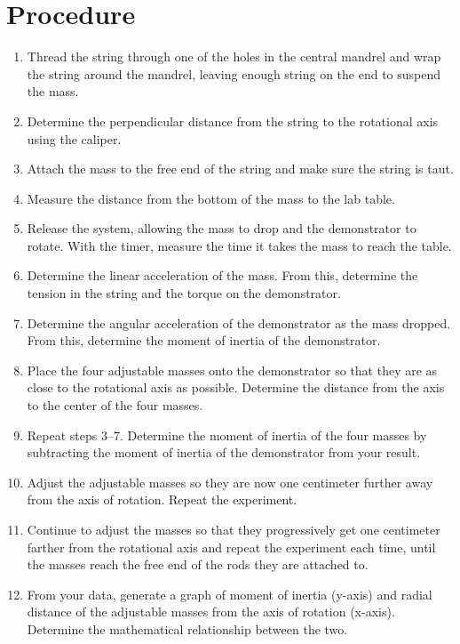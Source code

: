 \documentclass[11pt]{article}
\begin{document}
\section*{Procedure}
\begin{enumerate}[noitemsep]
    \item Thread the string through one of the holes in the central mandrel and wrap the string around the mandrel, leaving enough string on the end to suspend the mass.
    \item Determine the perpendicular distance from the string to the rotational axis using the caliper.
    \item Attach the mass to the free end of the string and make sure the string is taut.
    \item Measure the distance from the bottom of the mass to the lab table.
    \item Release the system, allowing the mass to drop and the demonstrator to rotate. With the timer, measure the time it takes the mass to reach the table.
    \item Determine the linear acceleration of the mass. From this, determine the tension in the string and the torque on the demonstrator.
    \item Determine the angular acceleration of the demonstrator as the mass dropped. From this, determine the moment of inertia of the demonstrator.
    \item Place the four adjustable masses onto the demonstrator so that they are as close to the rotational axis as possible. Determine the distance from the axis to the center of the four masses.
    \item Repeat steps 3--7. Determine the moment of inertia of the four masses by subtracting the moment of inertia of the demonstrator from your result.
    \item Adjust the adjustable masses so they are now one centimeter further away from the axis of rotation. Repeat the experiment.
    \item Continue to adjust the masses so that they progressively get one centimeter farther from the rotational axis and repeat the experiment each time, until the masses reach the free end of the rods they are attached to.
    \item From your data, generate a graph of moment of inertia (y-axis) and radial distance of the adjustable masses from the axis of rotation (x-axis). Determine the mathematical relationship between the two.
\end{enumerate}
\end{document}
